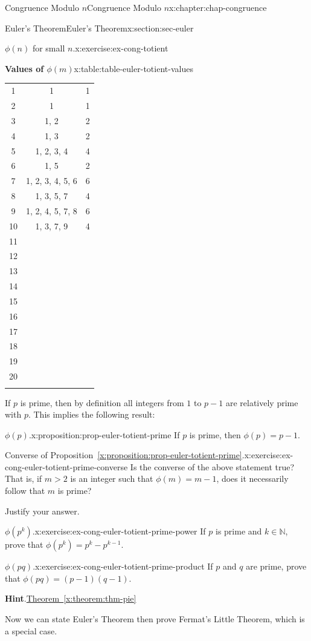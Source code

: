 \documentclass[oneside,10pt,]{book}
\newcommand{\blocktitlefont}{\relax}
\newcommand{\xreffont}{\relax}
\numberwithin{equation}{section}
\newcommand{\hrulemedium}{\noalign{\hrule height 0.07em}}
\newlength{\qrsize}
\newcommand{\gt}{>}
\begin{document}
\begin{chapterptx}{Congruence Modulo \(n\)}{}{Congruence Modulo \(n\)}{}{}{x:chapter:chap-congruence}
\begin{sectionptx}{Euler's Theorem}{}{Euler's Theorem}{}{}{x:section:sec-euler}
\begin{inlineexercise}{\(\phi(n)\) for small \(n\).}{x:exercise:ex-cong-totient}
\begin{tableptx}{\textbf{Values of \(\phi(m)\)}}{x:table:table-euler-totient-values}{}
{\begin{tabular}{ccc}
1&1&1\tabularnewline[0pt]
2&1&1\tabularnewline[0pt]
3&1, 2&2\tabularnewline[0pt]
4&1, 3&2\tabularnewline[0pt]
5&1, 2, 3, 4&4\tabularnewline\hrulemedium
6&1, 5&2\tabularnewline[0pt]
7&1, 2, 3, 4, 5, 6&6\tabularnewline[0pt]
8&1, 3, 5, 7&4\tabularnewline[0pt]
9&1, 2, 4, 5, 7, 8&6\tabularnewline[0pt]
10&1, 3, 7, 9&4\tabularnewline\hrulemedium
11&&\tabularnewline[0pt]
12&&\tabularnewline[0pt]
13&&\tabularnewline[0pt]
14&&\tabularnewline[0pt]
15&&\tabularnewline\hrulemedium
16&&\tabularnewline[0pt]
17&&\tabularnewline[0pt]
18&&\tabularnewline[0pt]
19&&\tabularnewline[0pt]
20&&\tabularnewline\hrulemedium
\end{tabular}
}%
\end{tableptx}%
\end{inlineexercise}%
If \(p\) is prime, then by definition all integers from \(1\) to \(p-1\) are relatively prime with \(p\). This implies the following result:%
\begin{proposition}{\(\phi(p)\).}{}{x:proposition:prop-euler-totient-prime}%
If \(p\) is prime, then \(\phi(p) = p-1\).%
\end{proposition}
\begin{inlineexercise}{Converse of Proposition~{\xreffont\ref*{x:proposition:prop-euler-totient-prime}}.}{x:exercise:ex-cong-euler-totient-prime-converse}%
Is the converse of the above statement true? That is, if \(m \gt 2\) is an integer such that \(\phi(m) = m-1\), does it necessarily follow that \(m\) is prime?%
\par
Justify your answer.%
\end{inlineexercise}%
\begin{inlineexercise}{\(\phi(p^k)\).}{x:exercise:ex-cong-euler-totient-prime-power}%
If \(p\) is prime and \(k \in \mathbb{N}\), prove that \(\phi(p^k) = p^k - p^{k-1}\).%
\end{inlineexercise}%
\begin{inlineexercise}{\(\phi(pq)\).}{x:exercise:ex-cong-euler-totient-prime-product}%
If \(p\) and \(q\) are prime, prove that \(\phi(pq) = (p-1)(q-1)\).%
\par\smallskip%
\noindent\textbf{\blocktitlefont Hint}.\hypertarget{g:hint:id539099}{}\quad{}\hyperref[x:theorem:thm-pie]{Theorem~{\xreffont\ref{x:theorem:thm-pie}}}%
\end{inlineexercise}%
Now we can state Euler's Theorem then prove Fermat's Little Theorem, which is a special case.%
\begin{sidebyside}{1}{0}{0}{0}%
\begin{sbspanel}{1}%
\setlength{\qrsize}{9em}

\end{sbspanel}
\end{sidebyside}
\end{sectionptx}
\end{chapterptx}
\end{document}
